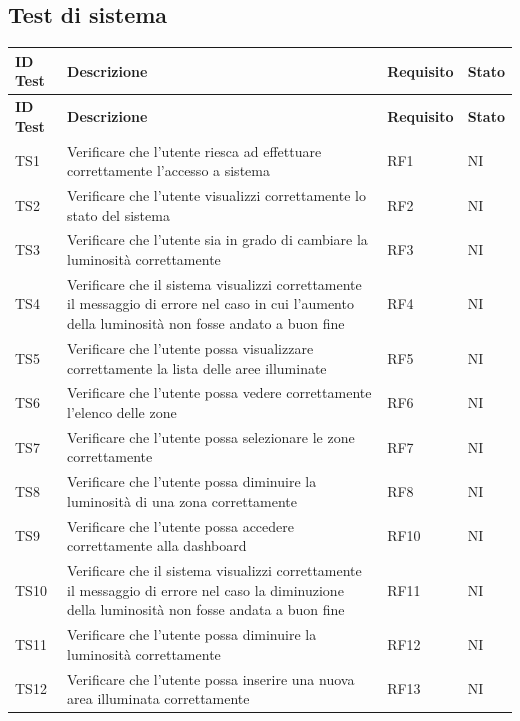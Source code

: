 \documentclass[12pt]{article}
\begin{document}
\subsection{Test di sistema}  
  \begin{xltabular}{\linewidth}{|>{\hsize}X|>{\hsize}X|>{\hsize}X|>{\hsize}X|}						
						
	\hline						
	\textbf{ID Test} & \textbf{Descrizione} & \textbf{Requisito} & \textbf{Stato} \\						
	\hline						
	\endfirsthead						
	\hline						
	\textbf{ID Test} & \textbf{Descrizione} & \textbf{Requisito} & \textbf{Stato} \\						
	\hline						
	\endhead						
	\hline						
	\endfoot						
	TS1	 & Verificare che l'utente riesca ad effettuare correttamente l'accesso a sistema	&	RF1	&	NI	\\
	\hline						
	TS2	 & Verificare che l'utente visualizzi correttamente lo stato del sistema	&	RF2	&	NI	\\
	\hline						
	TS3	 & Verificare che l'utente sia in grado di cambiare la luminosità correttamente	&	RF3	&	NI	\\
	\hline						
	TS4	 & Verificare che il sistema visualizzi correttamente il messaggio di errore nel caso in cui l'aumento della luminosità non fosse andato a buon fine 	&	RF4	&	NI	\\
	\hline						
	TS5	& Verificare che l'utente possa visualizzare correttamente la lista delle aree illuminate	&	RF5 	&	NI	\\
	\hline						
	TS6	& Verificare che l'utente possa vedere correttamente l'elenco delle zone	&	RF6	&	NI	\\
	\hline						
	TS7	 & Verificare che l'utente possa selezionare le zone correttamente	&	RF7	&	NI	\\
	\hline						
	TS8	 & Verificare che l'utente possa diminuire la luminosità di una zona correttamente	&	RF8	&	NI	\\
	\hline						
	TS9	 & Verificare che l'utente possa accedere correttamente alla dashboard	&	RF10	&	NI	\\
	\hline						
	TS10	 & Verificare che il sistema visualizzi correttamente il messaggio di errore nel caso la diminuzione della luminosità non fosse andata a buon fine 	&	RF11	&	NI	\\
	\hline						
	TS11	 & Verificare che l'utente possa diminuire la luminosità correttamente	&	RF12	&	NI	\\
	\hline						
	TS12	 & Verificare che l'utente possa inserire una nuova area illuminata correttamente	&	RF13	&	NI	\\

\end{xltabular}
\end{document}

